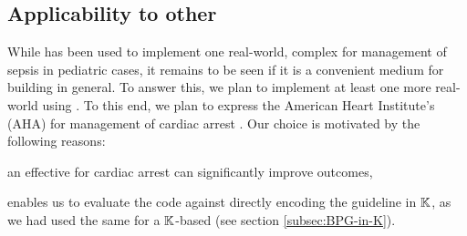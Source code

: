 
\subsection{Applicability to other \CDSSs{}}\label{subsec:applicability}

While \MediK{} has been used to implement one real-world, complex
\CDSSs{} for management of sepsis in pediatric cases, it remains
to be seen if it is a convenient medium for building \CDSSs{} in general.
To answer this, we plan to implement at least one more real-world \CDSS{}
using \MediK{}. To this end, we plan to express the American Heart Institute's
(AHA) \BPG{} for management of cardiac arrest \cite{AHAUrl}. Our choice
is motivated by the following reasons:
\begin{enumerate*}[label=(\roman*)]
  \item an effective \CDSS{} for cardiac arrest can significantly improve
    outcomes,
  \item enables us to evaluate the \MediK{} code against directly encoding
    the guideline in $\mathbb{K}$, as we had used the same \BPG{} for a $\mathbb{K}$-based \CDSSs{}
    (see section \ref{subsec:BPG-in-K}).
\end{enumerate*}

